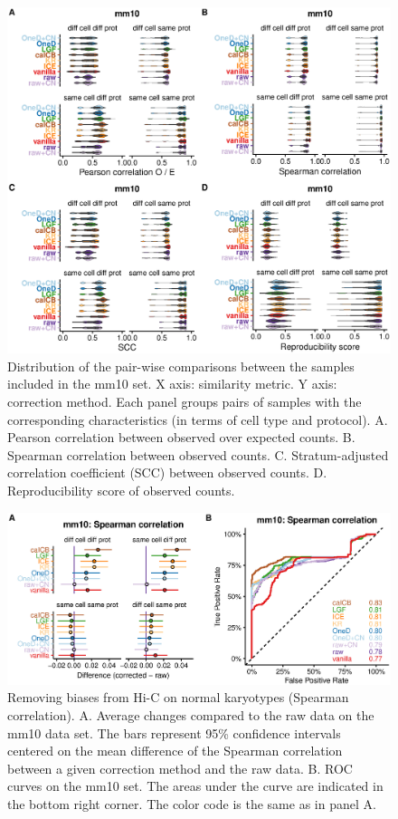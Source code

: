 \documentclass[12pt]{report}
\begin{document}
\begin{figure}
	\centerline{\includegraphics[width=\textwidth]{nar_figures/supp_figure_7.eps}}
    \caption{
    Distribution of the pair-wise comparisons between the samples included in
    the mm10 set. X axis: similarity metric. Y axis: correction
    method. Each panel groups pairs of samples with the corresponding
    characteristics (in terms of cell type and protocol). A. Pearson correlation
    between observed over expected counts. B. Spearman correlation between
    observed counts. C. Stratum-adjusted correlation coefficient (SCC) between
    observed counts. D. Reproducibility score of observed counts.}
\end{figure}

\begin{figure}
	\centerline{\includegraphics[width=\textwidth]{nar_figures/supp_figure_8.eps}}
    \caption{
    Removing biases from Hi-C on normal karyotypes (Spearman correlation). A. Average changes
    compared to the raw data on the mm10 data set. The bars represent
    95\% confidence intervals centered on the mean difference of the
    Spearman correlation between a given correction method and the raw
    data. B. ROC curves on the mm10 set. The areas under the curve are indicated
    in the bottom right corner. The color code is the same as in panel A.}
\end{figure}
\end{document}
